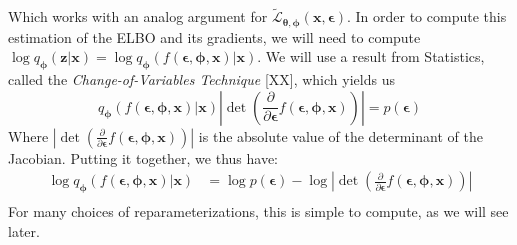 \documentclass[12pt]{report}
\theoremstyle{definition}
\begin{document}
Which works with an analog argument for $\tilde{\mathcal{L}}_{\pmb{\theta}, \pmb{\phi}}(\mathbf{x}, \pmb{\epsilon})$. In order to compute this estimation of the ELBO and its gradients, we will need to compute $\log q_{\mathbf{\phi}}(\mathbf{z}|\mathbf{x})=\log q_{\mathbf{\phi}}(f(\pmb{\epsilon}, \pmb{\phi}, \mathbf{x})|\mathbf{x})$. 
We will use a result from Statistics, called the \emph{Change-of-Variables Technique} [XX], which yields us 
\begin{equation}
q_{\mathbf{\phi}}(f(\pmb{\epsilon}, \pmb{\phi}, \mathbf{x})|\mathbf{x}) \left|\det \left(\frac{\partial}{\partial \pmb{\epsilon}}f(\pmb{\epsilon}, \pmb{\phi}, \mathbf{x})\right)\right| = p(\pmb{\epsilon})
\end{equation}
Where $\left|\det \left(\frac{\partial}{\partial \pmb{\epsilon}}f(\pmb{\epsilon}, \pmb{\phi}, \mathbf{x})\right)\right|$ is the absolute value of the determinant of the Jacobian. Putting it together, we thus have: 
\begin{equation}
\begin{split}
\log q_{\mathbf{\phi}}(f(\pmb{\epsilon}, \pmb{\phi}, \mathbf{x})|\mathbf{x}) & = \log p(\pmb{\epsilon}) - \log \left|\det \left(\frac{\partial}{\partial \pmb{\epsilon}}f(\pmb{\epsilon}, \pmb{\phi}, \mathbf{x})\right)\right| \\
\end{split}
\end{equation}
For many choices of reparameterizations, this is simple to compute, as we will see later.
\end{document}
